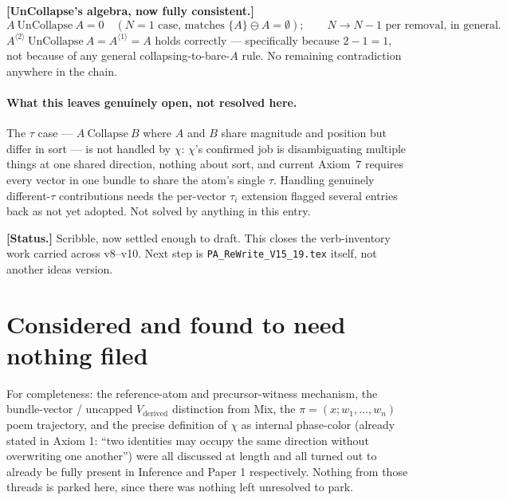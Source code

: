 \documentclass[11pt]{article}
\begin{document}
\textbf{[UnCollapse's algebra, now fully consistent.]}
\[
A\ \text{UnCollapse}\ A = 0 \quad (N=1\text{ case, matches }\{A\}\ominus A=\emptyset);
\qquad N \to N-1 \text{ per removal, in general.}
\]
$A^{\langle 2\rangle}\ \text{UnCollapse}\ A = A^{\langle 1\rangle} = A$
holds correctly --- specifically because $2-1=1$, not because of any
general collapsing-to-bare-$A$ rule. No remaining contradiction
anywhere in the chain.

\paragraph{What this leaves genuinely open, not resolved here.} The
$\tau$ case --- $A\ \text{Collapse}\ B$ where $A$ and $B$ share
magnitude and position but differ in sort --- is not handled by
$\chi$: $\chi$'s confirmed job is disambiguating multiple things at
one shared direction, nothing about sort, and current Axiom~7
requires every vector in one bundle to share the atom's single
$\tau$. Handling genuinely different-$\tau$ contributions needs the
per-vector $\tau_i$ extension flagged several entries back as not yet
adopted. Not solved by anything in this entry.

\textbf{[Status.]} Scribble, now settled enough to draft. This
closes the verb-inventory work carried across v8--v10. Next step is
\texttt{PA\_ReWrite\_V15\_19.tex} itself, not another ideas version.



\section{Considered and found to need nothing filed}

For completeness: the reference-atom and precursor-witness mechanism,
the bundle-vector / uncapped $V_{\text{derived}}$ distinction from
Mix, the $\pi=(x;w_1,\ldots,w_n)$ poem trajectory, and the precise
definition of $\chi$ as internal phase-color (already stated in
Axiom 1: ``two identities may occupy the same direction without
overwriting one another'') were all discussed at length and all
turned out to already be fully present in Inference and Paper 1
respectively. Nothing from those threads is parked here, since there
was nothing left unresolved to park.
\end{document}
